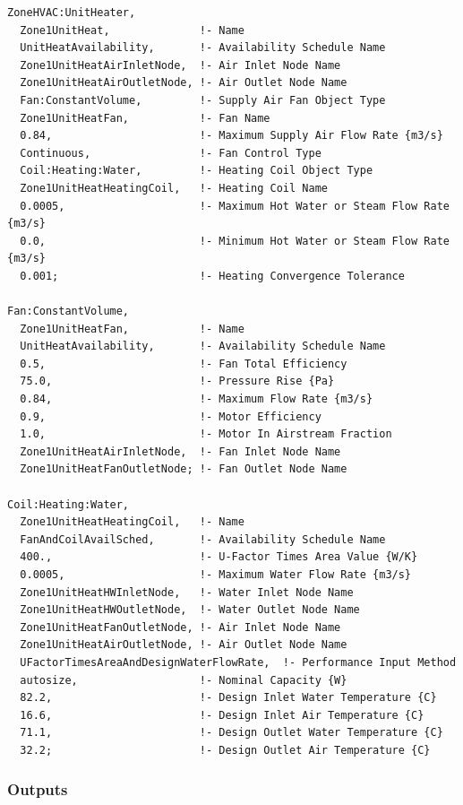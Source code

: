 \begin{lstlisting}
ZoneHVAC:UnitHeater,
  Zone1UnitHeat,              !- Name
  UnitHeatAvailability,       !- Availability Schedule Name
  Zone1UnitHeatAirInletNode,  !- Air Inlet Node Name
  Zone1UnitHeatAirOutletNode, !- Air Outlet Node Name
  Fan:ConstantVolume,         !- Supply Air Fan Object Type
  Zone1UnitHeatFan,           !- Fan Name
  0.84,                       !- Maximum Supply Air Flow Rate {m3/s}
  Continuous,                 !- Fan Control Type
  Coil:Heating:Water,         !- Heating Coil Object Type
  Zone1UnitHeatHeatingCoil,   !- Heating Coil Name
  0.0005,                     !- Maximum Hot Water or Steam Flow Rate {m3/s}
  0.0,                        !- Minimum Hot Water or Steam Flow Rate {m3/s}
  0.001;                      !- Heating Convergence Tolerance

Fan:ConstantVolume,
  Zone1UnitHeatFan,           !- Name
  UnitHeatAvailability,       !- Availability Schedule Name
  0.5,                        !- Fan Total Efficiency
  75.0,                       !- Pressure Rise {Pa}
  0.84,                       !- Maximum Flow Rate {m3/s}
  0.9,                        !- Motor Efficiency
  1.0,                        !- Motor In Airstream Fraction
  Zone1UnitHeatAirInletNode,  !- Fan Inlet Node Name
  Zone1UnitHeatFanOutletNode; !- Fan Outlet Node Name

Coil:Heating:Water,
  Zone1UnitHeatHeatingCoil,   !- Name
  FanAndCoilAvailSched,       !- Availability Schedule Name
  400.,                       !- U-Factor Times Area Value {W/K}
  0.0005,                     !- Maximum Water Flow Rate {m3/s}
  Zone1UnitHeatHWInletNode,   !- Water Inlet Node Name
  Zone1UnitHeatHWOutletNode,  !- Water Outlet Node Name
  Zone1UnitHeatFanOutletNode, !- Air Inlet Node Name
  Zone1UnitHeatAirOutletNode, !- Air Outlet Node Name
  UFactorTimesAreaAndDesignWaterFlowRate,  !- Performance Input Method
  autosize,                   !- Nominal Capacity {W}
  82.2,                       !- Design Inlet Water Temperature {C}
  16.6,                       !- Design Inlet Air Temperature {C}
  71.1,                       !- Design Outlet Water Temperature {C}
  32.2;                       !- Design Outlet Air Temperature {C}
\end{lstlisting}

\subsubsection{Outputs}\label{outputs-3-025}

